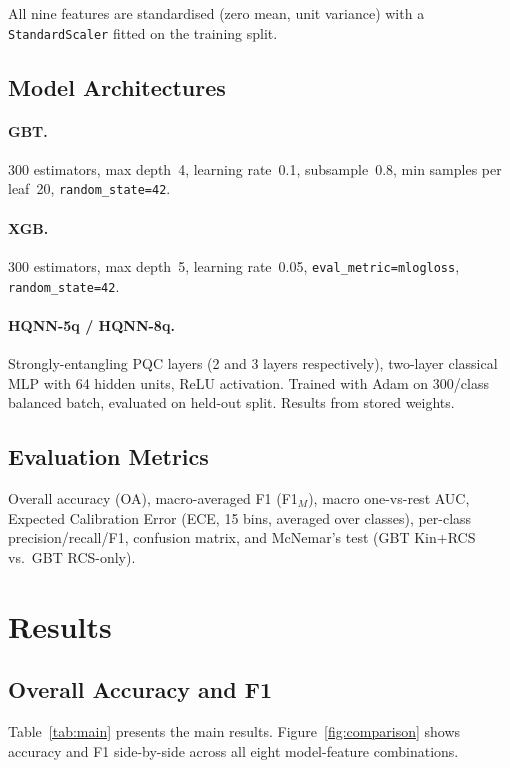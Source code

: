 \documentclass[journal]{IEEEtran}
\begin{document}
All nine features are standardised (zero mean, unit variance) with a
\texttt{StandardScaler} fitted on the training split.

\subsection{Model Architectures}

\paragraph{GBT.} 300 estimators, max depth~4, learning rate~0.1,
subsample~0.8, min samples per leaf~20, \texttt{random\_state=42}.

\paragraph{XGB.} 300 estimators, max depth~5, learning rate~0.05,
\texttt{eval\_metric=mlogloss}, \texttt{random\_state=42}.

\paragraph{HQNN-5q / HQNN-8q.} Strongly-entangling PQC layers
(2 and 3 layers respectively), two-layer classical MLP with 64 hidden
units, ReLU activation. Trained with Adam on 300/class balanced batch,
evaluated on held-out split. Results from stored weights.

\subsection{Evaluation Metrics}

Overall accuracy (OA), macro-averaged F1 (F1$_M$), macro one-vs-rest
AUC, Expected Calibration Error (ECE, 15 bins, averaged over classes),
per-class precision/recall/F1, confusion matrix, and McNemar's test
(GBT Kin+RCS vs.\ GBT RCS-only).

\section{Results}
\label{sec:results}

\subsection{Overall Accuracy and F1}

Table~\ref{tab:main} presents the main results. Figure~\ref{fig:comparison}
shows accuracy and F1 side-by-side across all eight model-feature
combinations.
\end{document}
